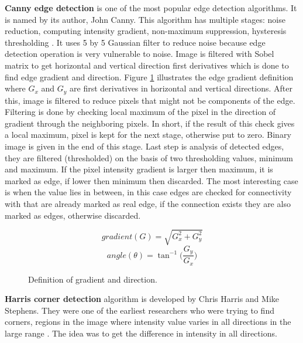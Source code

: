 \documentclass[../../../../main]{subfiles}
\begin{document}
\textbf{Canny edge detection} is one of the most popular edge detection algorithms. It is named by its author, John Canny. This algorithm has multiple stages: noise reduction, computing intensity gradient, non-maximum suppression, hysteresis thresholding \cite{opencv_docs_canny}. It uses 5 by 5 Gaussian filter to reduce noise because edge detection operation is very vulnerable to noise. Image is filtered with Sobel matrix \cite{opencv_docs_sobel_derivatives} to get horizontal and vertical direction first derivatives which is done to find edge gradient and direction. Figure \ref{fig:canny_gradient} illustrates the edge gradient definition where $G_x$ and $G_y$ are first derivatives in horizontal and vertical directions. After this, image is filtered to reduce pixels that might not be components of the edge. Filtering is done by checking local maximum of the pixel in the direction of gradient through the neighboring pixels. In short, if the result of this check gives a local maximum, pixel is kept for the next stage, otherwise put to zero. Binary image is given in the end of this stage. Last step is analysis of detected edges, they are filtered (thresholded) on the basis of two thresholding values, minimum and maximum. If the pixel intensity gradient is larger then maximum, it is marked as edge, if lower then minimum then discarded. The most interesting case is when the value lies in between, in this case edges are checked for connectivity with that are already marked as real edge, if the connection exists they are also marked as edges, otherwise discarded.

\begin{figure} [!ht]
  \centering    
    \begin{equation}
        gradient(G) = \sqrt{G_x^2+G_y^2}
    \end{equation}
     \begin{equation}
        angle(\theta) = \tan^{-1}\bigg(\frac{G_y}{G_x}\bigg)
    \end{equation}
    \label{fig:canny_gradient}
  \caption{Definition of gradient and direction.}
\end{figure}

\textbf{Harris corner detection} algorithm is developed by Chris Harris and Mike Stephens. They were one of the earliest researchers who were trying to find corners, regions in the image where intensity value varies in all directions in the large range \cite{opencv_docs_harris_corners_1}. The idea was to get the difference in intensity in all directions. 
\end{document}
